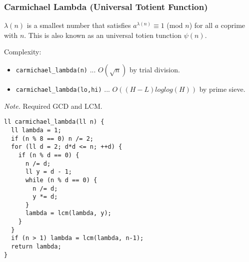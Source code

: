 \subsubsection{Carmichael Lambda (Universal Totient Function)}

$\lambda(n)$ is a smallest number that satisfies $a^{\lambda(n)} \equiv 1$ (mod $n$)
for all $a$ coprime with $n$. This is also known as an universal totien tunction $\psi(n)$.

Complexity:
\begin{itemize}
  \item \lstinline{carmichael_lambda(n)} ... $O(\sqrt{n})$ by trial division.
  \item \lstinline{carmichael_lambda(lo,hi)} ... $O((H-L) loglog(H))$ by prime sieve.
\end{itemize}

\textit{Note.} Required GCD and LCM.

\begin{lstlisting}
ll carmichael_lambda(ll n) {
  ll lambda = 1;
  if (n % 8 == 0) n /= 2;
  for (ll d = 2; d*d <= n; ++d) {
    if (n % d == 0) {
      n /= d;
      ll y = d - 1;
      while (n % d == 0) {
        n /= d;
        y *= d;
      }
      lambda = lcm(lambda, y);
    }
  }
  if (n > 1) lambda = lcm(lambda, n-1);
  return lambda;
}
\end{lstlisting}

